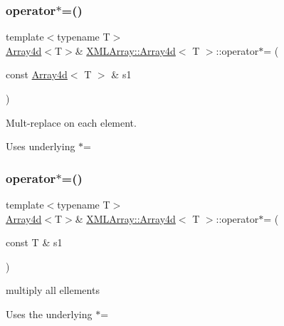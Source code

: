 \subsubsection{\texorpdfstring{operator$\ast$=()}{operator*=()}\hspace{0.1cm}{\footnotesize\ttfamily [3/6]}}
{\footnotesize\ttfamily template$<$typename T$>$ \\
\mbox{\hyperlink{classXMLArray_1_1Array4d}{Array4d}}$<$T$>$\& \mbox{\hyperlink{classXMLArray_1_1Array4d}{X\+M\+L\+Array\+::\+Array4d}}$<$ T $>$\+::operator$\ast$= (\begin{DoxyParamCaption}\item[{const \mbox{\hyperlink{classXMLArray_1_1Array4d}{Array4d}}$<$ T $>$ \&}]{s1 }\end{DoxyParamCaption})\hspace{0.3cm}{\ttfamily [inline]}}



Mult-\/replace on each element. 

Uses underlying $\ast$= \mbox{\label{classXMLArray_1_1Array4d_ac8c9fbcc39636658f94e7adc00c172b3}} 
\subsubsection{\texorpdfstring{operator$\ast$=()}{operator*=()}\hspace{0.1cm}{\footnotesize\ttfamily [4/6]}}
{\footnotesize\ttfamily template$<$typename T$>$ \\
\mbox{\hyperlink{classXMLArray_1_1Array4d}{Array4d}}$<$T$>$\& \mbox{\hyperlink{classXMLArray_1_1Array4d}{X\+M\+L\+Array\+::\+Array4d}}$<$ T $>$\+::operator$\ast$= (\begin{DoxyParamCaption}\item[{const T \&}]{s1 }\end{DoxyParamCaption})\hspace{0.3cm}{\ttfamily [inline]}}



multiply all ellements 

Uses the underlying $\ast$= \mbox{\label{classXMLArray_1_1Array4d_ac8c9fbcc39636658f94e7adc00c172b3}} 

